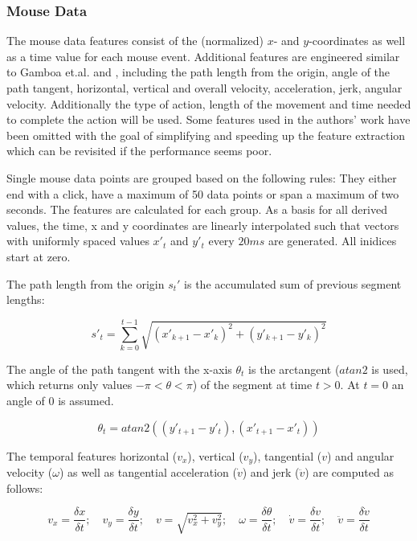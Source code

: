 \documentclass[
    fontsize=12pt,
    headings=small,
    parskip=half,           %
    bibliography=totoc,
    numbers=noenddot,       %
    open=any,               %
    final                   %
]{scrreprt}
\begin{document}
\label{concept_mouse_data}
\subsubsection{Mouse Data}

The mouse data features consist of the (normalized) $x$- and $y$-coordinates as well as a time value for each mouse event. Additional features are engineered similar to Gamboa et.al.\cite{GAMBOA2004} and \cite{https://doi.org/10.1049/iet-bmt.2018.5126}, including the path length from the origin, angle of the path tangent, horizontal, vertical and overall velocity, acceleration, jerk, angular velocity. Additionally the type of action, length of the movement and time needed to complete the action will be used. Some features used in the authors' work have been omitted with the goal of simplifying and speeding up the feature extraction which can be revisited if the performance seems poor.

Single mouse data points are grouped based on the following rules: They either end with a click, have a maximum of 50 data points or span a maximum of two seconds. The features are calculated for each group. As a basis for all derived values, the time, x and y coordinates are linearly interpolated such that vectors with uniformly spaced values $x'_t$ and $y'_t$ every $20ms$ are generated. All inidices start at zero.

The path length from the origin $s_t'$ is the accumulated sum of previous segment lengths:

\[
s'_t = \sum_{k = 0}^{t - 1} \sqrt{(x'_{k+1} - x'_{k})^2 + (y'_{k+1} - y'_{k})^2}
\]

The angle of the path tangent with the x-axis $\theta_t$ is the arctangent ($atan2$ is used, which returns only values $-\pi < \theta < \pi$) of the segment at time $t > 0$. At $t=0$ an angle of $0$ is assumed.

\[
\theta_t = atan2( (y'_{t+1} - y'_{t}), (x'_{t+1} - x'_{t}) )
\]

The temporal features horizontal ($v_x$), vertical ($v_y$), tangential ($v$) and angular velocity ($\omega$) as well as tangential acceleration ($\dot{v}$) and jerk ($\ddot{v}$) are computed as follows:

\[
v_x = \frac{\delta x}{\delta t}; \quad
v_y = \frac{\delta y}{\delta t}; \quad
v = \sqrt{v_x^2 + v_y^2}; \quad
\omega = \frac{\delta \theta}{\delta t}; \quad
\dot{v} = \frac{\delta v}{\delta t}; \quad
\ddot{v} = \frac{\delta \dot{v}}{\delta t}
\]
\end{document}
